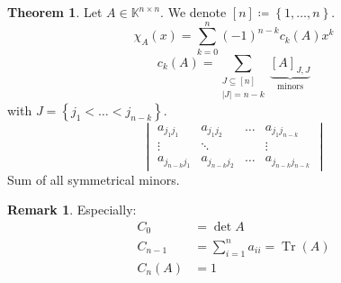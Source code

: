 \documentclass[a4paper,landscape,twocolumn]{article}
\newcommand\set[1]{\left\{#1\right\}}
\theoremstyle{definition}
\newtheorem{theorem}{Theorem}
\newtheorem{rem}{Remark}
\begin{document}
\begin{theorem}
  \label{satz-10.12}
  Let $A \in \mathbb K^{n\times n}$. We denote $[n] \coloneqq \set{1, \ldots, n}$.
  \[ \chi_A(x) = \sum_{k=0}^n (-1)^{n-k} c_k(A) x^k \]
  \[ c_k(A) = \sum_{\substack{J \subseteq [n] \\ |J| = n-k}} \underbrace{\left[A\right]_{J,J}}_{\text{minors}} \]
  with $J = \set{j_1 < \ldots < j_{n-k}}$.
  \[
    \begin{vmatrix}
      a_{j_1 j_1} & a_{j_1 j_2} & \ldots & a_{j_1 j_{n-k}} \\
      \vdots      & \ddots      &        & \vdots \\
      a_{j_{n-k} j_1} & a_{j_{n-k} j_2} & \ldots & a_{j_{n-k} j_{n-k}}
    \end{vmatrix}
  \]
  Sum of all symmetrical minors.
\end{theorem}
%
\begin{rem}
  Especially:
  \begin{align*}
    C_0 &= \det{A} \\
    C_{n-1} &= \sum_{i=1}^n a_{ii} = \operatorname{Tr}(A) \\
    C_n(A) &= 1
  \end{align*}
\end{rem}
%
\end{document}
